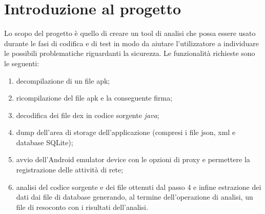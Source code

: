 
\section{Introduzione al progetto}\label{sec:introduzione-al-progetto}
Lo scopo del progetto è quello di creare un tool di analisi che possa essere usato durante le fasi di codifica e di test in modo da aiutare l'utilizzatore a individuare le possibili problematiche riguardanti la sicurezza.
Le funzionalità richieste sono le seguenti:
\begin{enumerate}
    \item decompilazione di un file apk;
    \item ricompilazione del file apk e la conseguente firma;
    \item decodifica dei file \gls{dex} in codice sorgente \textit{java};
    \item dump dell'area di storage dell'applicazione (compresi i file json, xml e database SQLite);
    \item avvio dell'Android emulator device con le opzioni di proxy e permettere la registrazione delle attività di rete;
    \item analisi del codice sorgente e dei file ottenuti dal passo 4 e infine estrazione dei dati dai file di database generando, al termine dell'operazione di analisi, un file di resoconto con i risultati dell'analisi.
\end{enumerate}